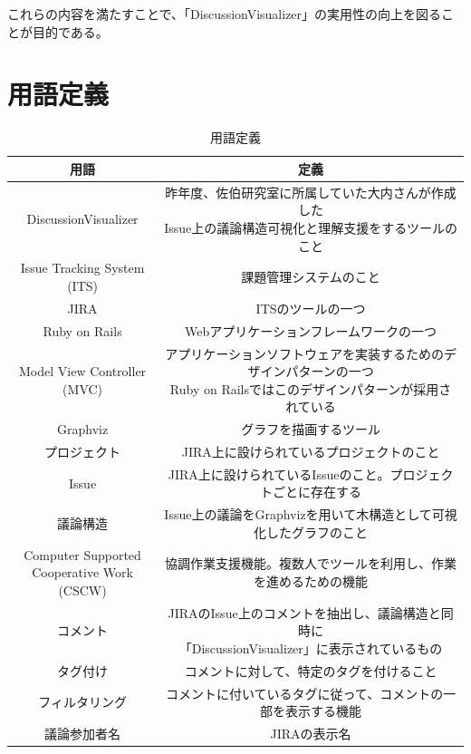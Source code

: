 \documentclass[12pt, oneside]{jreport}
\begin{document}
	これらの内容を満たすことで、「DiscussionVisualizer」の実用性の向上を図ることが目的である。

	\section{用語定義}
	\begin{table}[htb]
		\begin{center}
		\caption{用語定義}
		\small
  		\begin{tabular}{|c|c|} \hline
    		用語 & 定義 \\ \hline \hline
    		DiscussionVisualizer & \shortstack{昨年度、佐伯研究室に所属していた大内さんが作成した\\Issue上の議論構造可視化と理解支援をするツールのこと}  \\ \hline
		Issue Tracking System (ITS) & 課題管理システムのこと \\ \hline
		JIRA & ITSのツールの一つ \\ \hline
		Ruby on Rails & Webアプリケーションフレームワークの一つ \\ \hline
		\shortstack{Model View Controller \\(MVC)} & \shortstack{アプリケーションソフトウェアを実装するためのデザインパターンの一つ\\ Ruby on Railsではこのデザインパターンが採用されている} \\ \hline
		Graphviz & グラフを描画するツール \\ \hline
		プロジェクト & JIRA上に設けられているプロジェクトのこと  \\ \hline
		Issue & JIRA上に設けられているIssueのこと。プロジェクトごとに存在する  \\ \hline
    		議論構造 & Issue上の議論をGraphvizを用いて木構造として可視化したグラフのこと  \\ \hline
    		\shortstack{Computer Supported \\ Cooperative Work (CSCW)} & 協調作業支援機能。複数人でツールを利用し、作業を進めるための機能  \\ \hline
    		コメント & \shortstack{JIRAのIssue上のコメントを抽出し、議論構造と同時に\\「DiscussionVisualizer」に表示されているもの}  \\ \hline
		タグ付け & コメントに対して、特定のタグを付けること  \\ \hline
		フィルタリング & コメントに付いているタグに従って、コメントの一部を表示する機能  \\ \hline
    		議論参加者名 & JIRAの表示名  \\ \hline
  		\end{tabular}
		\normalsize
  		\end{center}
	\end{table}	
	
\end{document}
